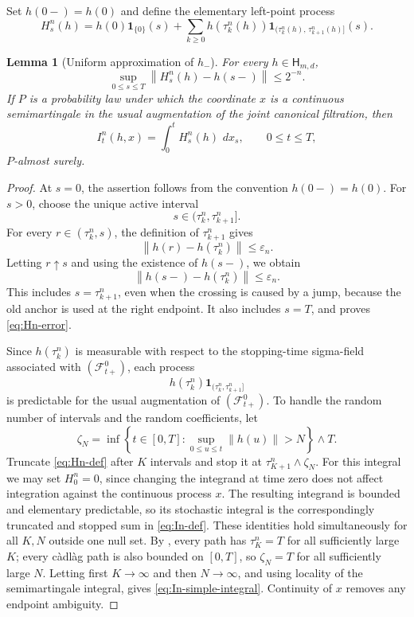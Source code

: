 \documentclass[11pt,reqno]{amsart}
\theoremstyle{plain}
\newtheorem{lemma}[lemma]{Lemma}
\theoremstyle{definition}
\newcommand{\cF}{\mathcal F}
\newcommand{\eps}{\varepsilon}
\newcommand{\one}{\mathbf 1}
\newcommand{\dd}{\,d}
\newcommand{\norm}[1]{\left\lVert #1\right\rVert}
\begin{document}
Set \(h(0-)=h(0)\) and define the elementary left-point process
\begin{equation}\label{eq:Hn-def}
  H_s^n(h)
  =
  h(0)\one_{\{0\}}(s)
  +
  \sum_{k\ge0}
  h(\tau_k^n(h))
  \one_{(\tau_k^n(h),\,\tau_{k+1}^n(h)]}(s).
\end{equation}

\begin{lemma}[Uniform approximation of \(h_-\)]\label{lem:integrand-approx}
For every \(h\in\mathsf H_{m,d}\),
\begin{equation}\label{eq:Hn-error}
  \sup_{0\le s\le T}
  \norm{H_s^n(h)-h(s-)}
  \le 2^{-n}.
\end{equation}
If \(P\) is a probability law under which the coordinate \(x\) is a continuous
semimartingale in the usual augmentation of the joint canonical filtration,
then
\begin{equation}\label{eq:In-simple-integral}
  I_t^n(h,x)=\int_0^t H_s^n(h)\,\dd x_s,
  \qquad 0\le t\le T,
\end{equation}
\(P\)-almost surely.
\end{lemma}

\begin{proof}
At \(s=0\), the assertion follows from the convention \(h(0-)=h(0)\).
For \(s>0\), choose the unique active interval
\[
  s\in(\tau_k^n,\tau_{k+1}^n].
\]
For every \(r\in(\tau_k^n,s)\), the definition of
\(\tau_{k+1}^n\) gives
\[
  \norm{h(r)-h(\tau_k^n)}\le\eps_n.
\]
Letting \(r\uparrow s\) and using the existence of \(h(s-)\), we obtain
\[
  \norm{h(s-)-h(\tau_k^n)}\le\eps_n.
\]
This includes \(s=\tau_{k+1}^n\), even when the crossing is caused by a
jump, because the old anchor is used at the right endpoint.  It also includes
\(s=T\), and proves \eqref{eq:Hn-error}.

Since \(h(\tau_k^n)\) is measurable with respect to the stopping-time
sigma-field associated with \((\cF_{t+}^0)\), each process
\[
  h(\tau_k^n)\one_{(\tau_k^n,\tau_{k+1}^n]}
\]
is predictable for the usual augmentation of \((\cF_{t+}^0)\).  To handle
the random number of intervals and the random coefficients, let
\[
  \zeta_N
  =\inf\left\{
    t\in[0,T]:\sup_{0\le u\le t}\norm{h(u)}>N
  \right\}\wedge T.
\]
Truncate \eqref{eq:Hn-def} after \(K\) intervals and stop it at
\(\tau_{K+1}^n\wedge\zeta_N\).  For this integral we may set
\(H_0^n=0\), since changing the integrand at time zero does not affect
integration against the continuous process \(x\).  The resulting integrand is bounded and
elementary predictable, so its stochastic integral is the correspondingly
truncated and stopped sum in \eqref{eq:In-def}.  These identities hold
simultaneously for all \(K,N\) outside one null set.  By
, every path has \(\tau_K^n=T\) for all sufficiently
large \(K\); every c\`adl\`ag path is also bounded on \([0,T]\), so
\(\zeta_N=T\) for all sufficiently large \(N\).  Letting first
\(K\to\infty\) and then \(N\to\infty\), and using locality of the
semimartingale integral, gives \eqref{eq:In-simple-integral}.  Continuity of
\(x\) removes any endpoint ambiguity.
\end{proof}
\end{document}
